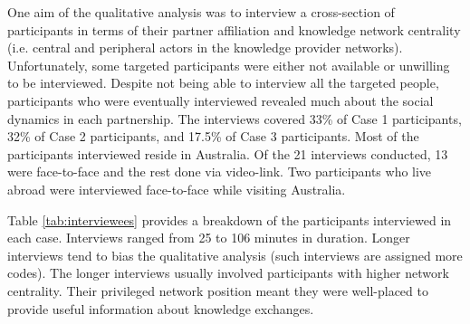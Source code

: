 One aim of the qualitative analysis was to interview a cross-section of participants in terms of their partner affiliation and knowledge network centrality (i.e. central and peripheral actors in the knowledge provider networks). Unfortunately, some targeted participants were either not available or unwilling to be interviewed. Despite not being able to interview all the targeted people, participants who were eventually interviewed revealed much about the social dynamics in each partnership. The interviews covered 33\% of Case 1 participants, 32\% of Case 2 participants, and 17.5\% of Case 3 participants. Most of the participants interviewed reside in Australia. Of the 21 interviews conducted, 13 were face-to-face and the rest done via video-link. Two participants who live abroad were interviewed face-to-face while visiting Australia. \medskip

Table \ref{tab:interviewees} provides a breakdown of the participants interviewed in each case. Interviews ranged from 25 to 106 minutes in duration. Longer interviews tend to bias the qualitative analysis (such interviews are assigned more codes). The longer interviews usually involved participants with higher network centrality. Their privileged network position meant they were well-placed to provide useful information about knowledge exchanges. \medskip

